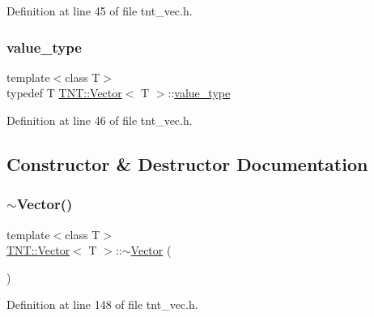 Definition at line 45 of file tnt\+\_\+vec.\+h.

\mbox{\label{classTNT_1_1Vector_a329d23fe25894a94d461353dd9c7c1be}} 
\subsubsection{\texorpdfstring{value\+\_\+type}{value\_type}}
{\footnotesize\ttfamily template$<$class T$>$ \\
typedef T \hyperlink{classTNT_1_1Vector}{T\+N\+T\+::\+Vector}$<$ T $>$\+::\hyperlink{classTNT_1_1Vector_a329d23fe25894a94d461353dd9c7c1be}{value\+\_\+type}}



Definition at line 46 of file tnt\+\_\+vec.\+h.



\subsection{Constructor \& Destructor Documentation}
\mbox{\label{classTNT_1_1Vector_a29e491d8f3a77612be73b6b69c04f060}} 
\subsubsection{\texorpdfstring{$\sim$\+Vector()}{~Vector()}}
{\footnotesize\ttfamily template$<$class T$>$ \\
\hyperlink{classTNT_1_1Vector}{T\+N\+T\+::\+Vector}$<$ T $>$\+::$\sim$\hyperlink{classTNT_1_1Vector}{Vector} (\begin{DoxyParamCaption}{ }\end{DoxyParamCaption})\hspace{0.3cm}{\ttfamily [inline]}}



Definition at line 148 of file tnt\+\_\+vec.\+h.

\mbox{\label{classTNT_1_1Vector_a55481f65669664062299cef9a44f9e2e}} 

